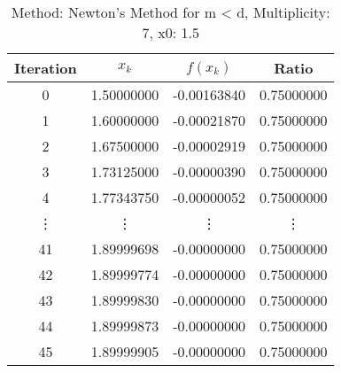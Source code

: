 \begin{table}
\centering
\caption{Method: Newton's Method for m < d, Multiplicity: 7, x0: 1.5}
\label{tab:table_Newton's_Method_for_m_<_d_7_1_5}
\begin{tabular}{c c c c}
\toprule
Iteration &      $x_k$ &    $f(x_k)$ &      Ratio \\
\midrule
        0 & 1.50000000 & -0.00163840 & 0.75000000 \\
        1 & 1.60000000 & -0.00021870 & 0.75000000 \\
        2 & 1.67500000 & -0.00002919 & 0.75000000 \\
        3 & 1.73125000 & -0.00000390 & 0.75000000 \\
        4 & 1.77343750 & -0.00000052 & 0.75000000 \\
   \vdots &     \vdots &      \vdots &     \vdots \\
       41 & 1.89999698 & -0.00000000 & 0.75000000 \\
       42 & 1.89999774 & -0.00000000 & 0.75000000 \\
       43 & 1.89999830 & -0.00000000 & 0.75000000 \\
       44 & 1.89999873 & -0.00000000 & 0.75000000 \\
       45 & 1.89999905 & -0.00000000 & 0.75000000 \\
\bottomrule
\end{tabular}
\end{table}

